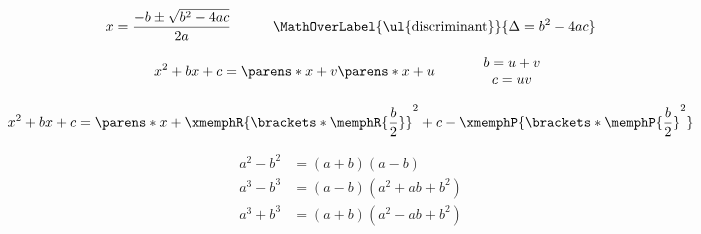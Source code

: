 \begin{multicols}{2}
\begin{CheatsheetEntryFrame}
    \end{CheatsheetEntryFrame}


    \begin{CheatsheetEntryFrame}

        \begin{gather*}
            x = \frac{-b \pm \sqrt{b^2 - 4ac}}{2a}
            \qquad\quad
            \MathOverLabel{\text{\ul{discriminant}}}{\Delta = b^2 - 4ac}
        \end{gather*}

        \begin{equation*}
            x^2 + bx + c = \parens*{x+v} \parens*{x+u}
            \qquad\quad
                \begin{array}{c}
                    b = u+v \\
                    c = uv
                \end{array}
        \end{equation*}
        \vspace{-2ex} %

        \begin{equation*}
            x^2 + b x + c = \parens*{x + \xmemphR{\brackets*{\memphR{\frac{b}{2}}}}}^2 + c - \xmemphP{\brackets*{\memphP{\frac{b}{2}}}^2}
        \end{equation*}

    \end{CheatsheetEntryFrame}

    \begin{CheatsheetEntryFrame}

        \begin{align*}
            a^2 - b^2 &= (a + b) (a - b) \\
            a^3 - b^3 &= (a - b) (a^2 + ab + b^2) \\
            a^3 + b^3 &= (a + b) (a^2 - ab + b^2)
        \end{align*}

    \end{CheatsheetEntryFrame}

\end{multicols}
\newpage

